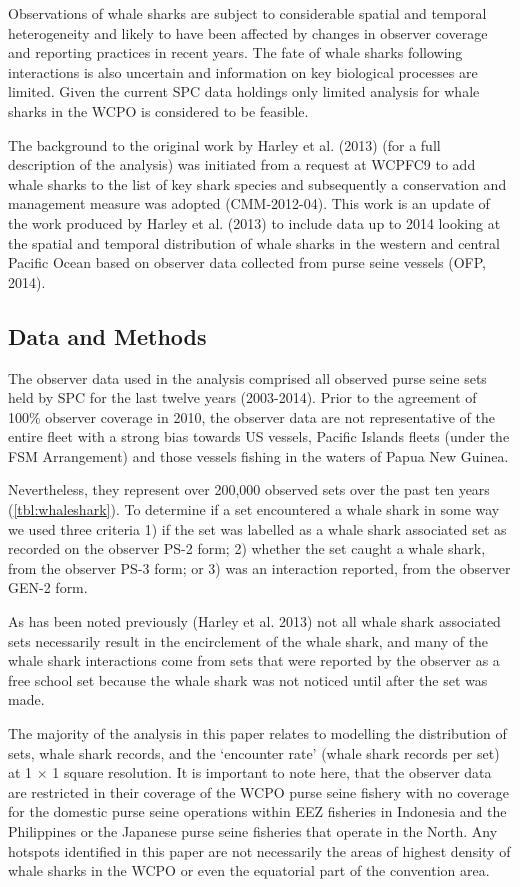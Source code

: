 \documentclass[12pt]{SCreport}
\begin{document}
Observations of whale sharks are subject to considerable spatial and temporal heterogeneity and likely to have been affected by changes in observer coverage and reporting practices in recent years. The fate of whale sharks following interactions is also uncertain and information on key biological processes are limited. Given the current SPC data holdings only limited analysis for whale sharks in the WCPO is considered to be feasible.

The background to the original work by Harley et al. (2013) (for a full description of the analysis) was initiated from a request at WCPFC9 to add whale sharks to the list of key shark species and subsequently a conservation and management measure was adopted (CMM-2012-04).  This work is an update of the work produced by Harley et al. (2013) to include data up to 2014 looking at the spatial and temporal distribution of whale sharks in the western and central Pacific Ocean based on observer data collected from purse seine vessels (OFP, 2014).
  
\subsection{Data and Methods}
The observer data used in the analysis comprised all observed purse seine sets held by SPC for the last twelve years (2003-2014). Prior to the agreement of 100\% observer coverage in 2010, the observer data are not representative of the entire fleet with a strong bias towards US vessels, Pacific Islands fleets (under the FSM Arrangement) and those vessels fishing in the waters of Papua New Guinea.

Nevertheless, they represent over 200,000 observed sets over the past ten years (\ref{tbl:whaleshark}). To determine if a set encountered a whale shark in some way we used three criteria 1) if the set was labelled as a whale shark associated set as recorded on the observer PS-2 form; 2) whether the set caught a whale shark, from the observer PS-3 form; or 3) was an interaction reported, from the observer GEN-2 form.

As has been noted previously (Harley et al. 2013) not all whale shark associated sets necessarily result in the encirclement of the whale shark, and many of the whale shark interactions come from sets that were reported by the observer as a free school set because the whale shark was not noticed until after the set was made. 

The majority of the analysis in this paper relates to modelling the distribution of sets, whale shark records, and the `encounter rate' (whale shark records per set) at 1 $\times$ 1 \degree square resolution. It is important to note here, that the observer data are restricted in their coverage of the WCPO purse seine fishery with no coverage for the domestic purse seine operations within EEZ fisheries in Indonesia and the Philippines or the Japanese purse seine fisheries that operate in the North. Any hotspots identified in this paper are not necessarily the areas of highest density of whale sharks in the WCPO or even the equatorial part of the convention area.
\end{document}
